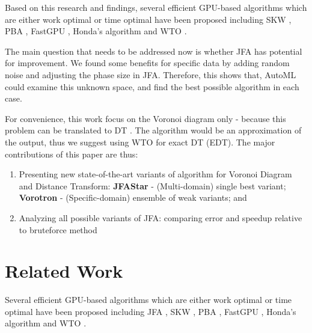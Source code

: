\documentclass[format=acmsmall,screen,review,authordraft,nonacm]{acmart}
\newcommand{\ourjfasingle}{JFAStar}
\newcommand{\ourjfa}{Vorotron} %
\begin{document}
Based on this research and findings, several efficient GPU-based algorithms which are either
work optimal or time optimal have been proposed including
SKW \cite{schneider2009gpu}, PBA \cite{cao2010parallel}, FastGPU \cite{de2017fast}, Honda's algorithm \cite{honda2017simple} and
WTO \cite{manduhu2019work}.

The main question that needs to be addressed now is whether JFA has potential
for improvement. We found some benefits for specific data by adding random noise
and adjusting the phase size in JFA. Therefore, this shows that, AutoML could examine this
unknown space, and find the best possible algorithm in each case.

For convenience, this work focus on the Voronoi diagram only - because this problem can be translated to DT \cite{rong2006jump}.
The algorithm would be an approximation of the output, thus we suggest using WTO
\cite{manduhu2019work} for exact DT (EDT). The major contributions of this paper are thus:

\begin{enumerate}
	\item Presenting new state-of-the-art variants of algorithm for Voronoi
		Diagram and Distance Transform: \newline
		\textbf{\ourjfasingle} - (Multi-domain) single best variant;
		\textbf{\ourjfa} - (Specific-domain) ensemble of weak variants; and
	\item Analyzing all possible variants of JFA: comparing error and speedup
		relative to bruteforce method
\end{enumerate}

\section{Related Work} %

Several efficient GPU-based algorithms which are either
work optimal or time optimal have been proposed including
JFA \cite{rong2006jump}, SKW \cite{schneider2009gpu},
PBA \cite{cao2010parallel}, FastGPU \cite{de2017fast}, Honda's algorithm \cite{honda2017simple} and
WTO \cite{manduhu2019work}.
\end{document}
